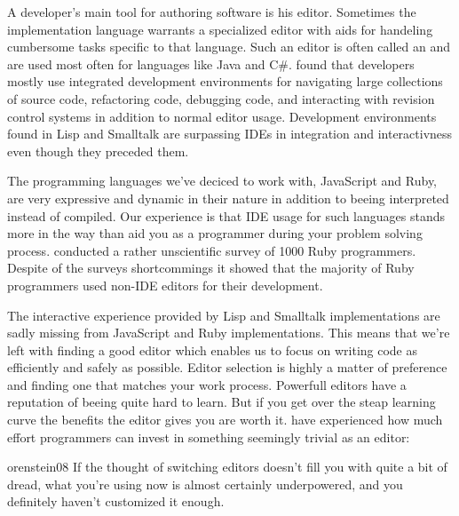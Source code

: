 A developer's main tool for authoring software is his editor. Sometimes the
implementation language warrants a specialized editor with aids for
handeling cumbersome tasks specific to that language. Such an editor is often
called an %
and are used most often for languages like Java and C\#.
\citet{murphy06} found that developers mostly use integrated
development environments for navigating large
collections of source code, refactoring code, debugging code, and interacting
with revision control systems in addition to normal editor usage.
Development environments found in Lisp%
and Smalltalk%
are surpassing IDEs in integration and interactivness even though they
preceded them.

The programming languages we've deciced to work with, JavaScript and Ruby, are
very expressive and dynamic in their nature in addition to beeing interpreted
instead of compiled. Our experience is that IDE usage for such languages
stands more in the way than aid you as a programmer during your problem
solving process.
\citet{bray07} conducted a rather unscientific survey of 1000 Ruby
programmers. Despite of the surveys shortcommings it showed that
the majority of Ruby programmers used non-IDE editors for their
development.

The interactive experience provided by Lisp and Smalltalk implementations are
sadly missing%
from JavaScript and Ruby implementations. This means that we're left with
finding a good editor which enables us to focus on writing code as efficiently
and safely as possible. Editor selection is highly a matter of preference and
finding one that matches your work process. Powerfull editors have a
reputation of beeing quite hard to learn. But if you get over the steap
learning curve the benefits the editor gives you are worth it.
\citeauthor{orenstein08} have experienced how much effort programmers can
invest in something seemingly trivial as an editor:

\begin{citequote}{orenstein08}
  If the thought of switching editors doesn't fill you with quite a bit of
  dread, what you're using now is almost certainly underpowered, and you
  definitely haven't customized it enough.
\end{citequote}


